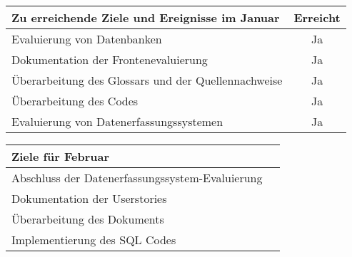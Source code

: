 \begin{tabularx}{\textwidth}{Xc}
    \arrayrulecolor{OliveGreen}
    \toprule
    {\bfseries Zu erreichende Ziele und Ereignisse im Januar} & {\bfseries Erreicht} \\
    \midrule[2pt]
    Evaluierung von Datenbanken                                 &Ja                    \\
    \rowcolor{OliveGreen!15}
    Dokumentation der Frontenevaluierung                        &Ja                    \\
    \rowcolor{White}
    Überarbeitung des Glossars und der Quellennachweise         &Ja                    \\
    \rowcolor{OliveGreen!15}
    Überarbeitung des \latex{} Codes                            &Ja                    \\
    \rowcolor{White}
    Evaluierung von Datenerfassungssystemen                     &Ja                    \\
    \bottomrule[2pt]
\end{tabularx}
%
\vspace{1cm}
%
\begin{tabularx}{\textwidth}{Xc}
    \arrayrulecolor{OliveGreen}
    \toprule
    {\bfseries Ziele für Februar}                         &                      \\
    \midrule[2pt]
    Abschluss der Datenerfassungssystem\hyp{}Evaluierung &                      \\
    \rowcolor{OliveGreen!15}
    Dokumentation der Userstories                       &                      \\
    \rowcolor{White}
    Überarbeitung des Dokuments                         &                      \\
    \rowcolor{OliveGreen!15}
    Implementierung des SQL Codes                     &                      \\
\end{tabularx}
